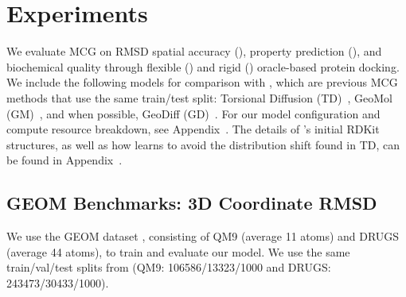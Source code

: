 \section{Experiments}
\vspace{-1ex}


We evaluate MCG on RMSD spatial accuracy (), property prediction (), and biochemical quality through flexible () and rigid () oracle-based protein docking.
We include the following models for comparison with \modelns, which are previous MCG methods that use the same train/test split: Torsional Diffusion (TD)~\citep{torsional-diffusion}, GeoMol (GM)~\citep{GeoMol}, and when possible, GeoDiff (GD)~\citep{geodiff}.  
For our model configuration and compute resource breakdown, see Appendix~. 
The details of \modelns's initial RDKit structures, as well as how \model learns to avoid the distribution shift found in TD, can be found in Appendix~.

\vspace{-1ex}
\subsection{GEOM Benchmarks: 3D Coordinate RMSD}
\label{sec:rmsd}
\vspace{-1ex}
We use the GEOM dataset \citep{GEOM}, consisting of QM9 (average 11 atoms) and DRUGS (average 44 atoms), to train and evaluate our model. 
We use the same train/val/test splits from \citet{GeoMol} (QM9: 106586/13323/1000 and DRUGS: 243473/30433/1000).
\vspace{-1ex}
